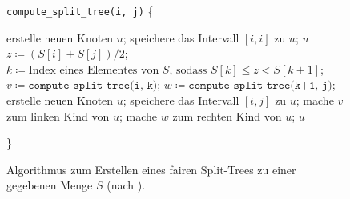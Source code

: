 \begin{figure}
	\centering
	\begin{minipage}{.8\linewidth}
		\scriptsize
		\begin{algorithmic}[H]
			\STATE \texttt{compute\_split\_tree(i, j)}  \{
			\begin{ALC@g}
					\STATE erstelle neuen Knoten $u$;
					\STATE speichere das Intervall $[i,i]$ zu $u$;
					\RETURN $u$
				\ELSE
					\STATE $z \coloneqq (S[i] + S[j]) / 2$;
					\STATE $k \coloneqq \text{Index eines Elementes von } S \text{, sodass } S[k] \leq z < S[k+1]$;
					\STATE $v \coloneqq \texttt{compute\_split\_tree(i, k)}$;
					\STATE $w \coloneqq \texttt{compute\_split\_tree(k+1, j)}$;
					\STATE erstelle neuen Knoten $u$;
					\STATE speichere das Intervall $[i, j]$ zu $u$;
					\STATE mache $v$ zum linken Kind von $u$;
					\STATE mache $w$ zum rechten Kind von $u$;
					\RETURN $u$
				\ENDIF
			\end{ALC@g}
			\STATE \}
		\end{algorithmic}
	\end{minipage}
	\caption{Algorithmus zum Erstellen eines fairen Split-Trees zu einer gegebenen Menge $S$ (nach \cite{gudmundsson}).}
	\label{fig:splittree}
\end{figure}

